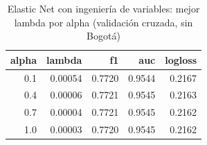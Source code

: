 \begin{table}[ht]
\centering
\begin{tabular}{rrrrr}
  \hline
alpha & lambda & f1 & auc & logloss \\ 
  \hline
0.1 & 0.00054 & 0.7720 & 0.9544 & 0.2167 \\ 
  0.4 & 0.00006 & 0.7721 & 0.9545 & 0.2163 \\ 
  0.7 & 0.00004 & 0.7721 & 0.9545 & 0.2162 \\ 
  1.0 & 0.00003 & 0.7720 & 0.9545 & 0.2162 \\ 
   \hline
\end{tabular}
\caption{Elastic Net con ingeniería de variables: mejor lambda por alpha (validación cruzada, sin Bogotá)} 
\end{table}
